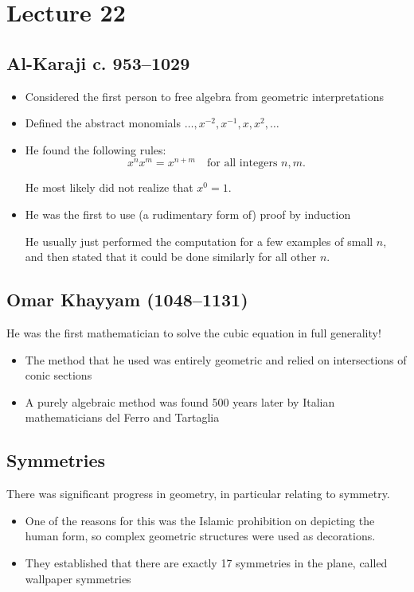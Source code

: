 \documentclass[class=article, crop=false]{standalone}
\begin{document}
  \section{Lecture 22}
  \subsection{Al-Karaji c. 953--1029}
  \begin{itemize}
    \item Considered the first person to free algebra from geometric interpretations
    \item Defined the abstract monomials $\dotsc,x^{-2},x^{-1},x,x^2,\dotsc$
    \item He found the following rules:
    \[
      x^nx^m = x^{n + m}\quad\text{for all integers }n, m.
    \]
    \begin{note}{}
      He most likely did not realize that $x^0 = 1$.
    \end{note}
    \item He was the first to use (a rudimentary form of) proof by induction
    \begin{note}{}
      He usually just performed the computation for a few examples of small $n$, and then stated that it could be done similarly for all other $n$.
    \end{note}
  \end{itemize}
  \subsection{Omar Khayyam (1048--1131)}
  He was the first mathematician to solve the cubic equation in full generality!
  \begin{itemize}
    \item The method that he used was entirely geometric and relied on intersections of conic sections
    \item A purely algebraic method was found 500 years later by Italian mathematicians del Ferro and Tartaglia
  \end{itemize}
  \subsection{Symmetries}
  There was significant progress in geometry, in particular relating to symmetry.
  \begin{itemize}
    \item One of the reasons for this was the Islamic prohibition on depicting the human form, so complex geometric structures were used as decorations.
    \item They established that there are exactly 17 symmetries in the plane, called wallpaper symmetries
  \end{itemize}
\end{document}
